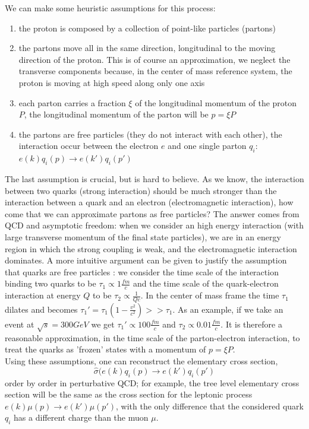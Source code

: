 We can make some heuristic assumptions for this process:
\begin{enumerate}
\item the proton is composed by a collection of point-like particles (partons)
\item the partons move all in the same direction, longitudinal to the moving direction of the proton. This is of course an approximation, we neglect the transverse components because, in the center of mass reference system, the proton is moving at high speed along only one axis
\item each parton carries a fraction $\xi$ of the longitudinal momentum of the proton $P$, the longitudinal momentum of the parton will be $p = \xi P$
\item the partons are free particles (they do not interact with each other), the interaction occur between the electron $e$ and one single parton $q_i$: $e(k) q_i(p) \to e(k') q_i(p')$
\end{enumerate}

The last assumption is crucial, but is hard to believe. As we know, the interaction between two quarks (strong interaction) should be much stronger than the interaction between a quark and an electron (electromagnetic interaction), how come that we can approximate partons as free particles? The answer comes from QCD and asymptotic freedom: when we consider an high energy interaction (with large transverse momentum of the final state particles), we are in an energy region in which the strong coupling is weak, and the electromagnetic interaction dominates. A more intuitive argument can be given to justify the assumption that quarks are free particles \cite{CTEQ:1994ydo} \cite{Collins:2003fm}: we consider the time scale of the interaction binding two quarks to be $\tau_1 \propto 1 \frac{fm}{c}$ and the time scale of the quark-electron interaction at energy $Q$ to be $\tau_2 \propto \frac{1}{Qc}$. In the center of mass frame the time $\tau_1$ dilates and becomes $\tau_1' = \tau_1(1-\frac{v^2}{c^2}) >> \tau_1$. As an example, if we take an event at $\sqrt{s} = 300 GeV$ we get $\tau_1' \propto 100 \frac{fm}{c}$ and $\tau_2 \propto 0.01\frac{fm}{c}$. It is therefore a reasonable approximation, in the time scale of the parton-electron interaction, to treat the quarks as 'frozen' states with a momentum of $p=\xi P$. \\

Using these assumptions, one can reconstruct the elementary cross section, $$\hat{\sigma}(e(k)q_i(p) \to e(k') q_i(p')$$ order by order in perturbative QCD; for example, the tree level elementary cross section will be the same as the cross section for the leptonic process $e(k) \mu(p) \to e(k') \mu(p')$, with the only difference that the considered quark $q_i$ has a different charge than the muon $\mu$.

